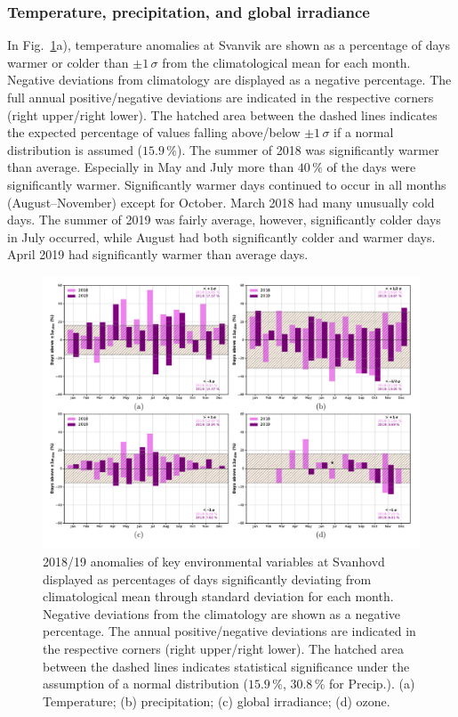 \documentclass[bg, manuscript]{copernicus}
\begin{document}
\subsubsection{Temperature, precipitation, and global irradiance}
\label{subsubsec:anomal_tpq}
In Fig.~\ref{fig:anomalies_svanvik}a), temperature anomalies at Svanvik are shown as a percentage of days warmer or colder than $\pm 1\,\sigma$ from the climatological mean for each month. Negative deviations from climatology are displayed as a negative percentage. The full annual positive/negative deviations are indicated in the respective corners (right upper/right lower). The hatched area between the dashed lines indicates the expected percentage of values falling above/below $\pm 1\,\sigma$ if a normal distribution is assumed ($15.9\,\unit{\%}$). The summer of 2018 was significantly warmer than average. Especially in May and July more than $40\,\unit{\%}$ of the days were significantly warmer. Significantly warmer days continued to occur in all months (August--November) except for October. March 2018 had many unusually cold days. The summer of 2019 was fairly average, however, significantly colder days in July occurred, while August had both significantly colder and warmer days. April 2019 had significantly warmer than average days.

\begin{figure}[t]
  \includegraphics[width=12cm]{fig08}
  \caption{2018/19 anomalies of key environmental variables at Svanhovd displayed as percentages of days significantly deviating from climatological mean through standard deviation for each month. Negative deviations from the climatology are shown as a negative percentage. The annual positive/negative deviations are indicated in the respective corners (right upper/right lower). The hatched area between the dashed lines indicates statistical significance under the assumption of a normal distribution ($15.9\,\unit{\%}$, $30.8\,\unit{\%}$ for Precip.). (a) Temperature; (b) precipitation; (c) global irradiance; (d) ozone.}
  \label{fig:anomalies_svanvik}
\end{figure}
\end{document}
